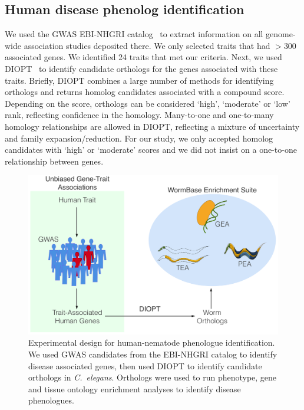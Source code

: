 \documentclass[10pt,letterpaper,twocolumn]{article}
\newcommand{\cel}{\emph{C.~elegans}}
\begin{document}
\subsection*{Human disease phenolog identification}
We used the GWAS EBI-NHGRI catalog~\cite{MacArthur2016} to extract information
on all genome-wide
association studies deposited there. We only selected traits that had $>300$
associated genes. We identified 24 traits that met our criteria. Next, we used
DIOPT~\cite{Hu2011} to identify candidate orthologs for the genes associated with these
traits. Briefly, DIOPT combines a large number of methods for identifying orthologs
and returns homolog candidates associated with a compound score. Depending on the score,
orthologs can be considered `high', `moderate' or `low' rank, reflecting confidence
in the homology. Many-to-one and one-to-many homology relationships are allowed
in DIOPT, reflecting a mixture of uncertainty and family expansion/reduction.
For our study, we only accepted homolog candidates with `high' or `moderate' scores
and we did not insist on a one-to-one relationship between genes.

\begin{figure}[htbp]
  \renewcommand{\familydefault}{\sfdefault}\normalfont{}
  \centering
  \includegraphics[width=\linewidth]{gwas-design.pdf}
  \caption{Experimental design for human-nematode phenologue identification.
           We used GWAS candidates from the EBI-NHGRI catalog to identify
           disease associated genes, then used DIOPT to identify candidate
           orthologs in \cel{}. Orthologs were used to run phenotype, gene
           and tissue ontology enrichment analyses to identify disease
           phenologues.}
\label{fig:gwas}
\end{figure}
\end{document}

